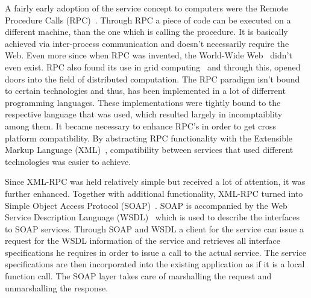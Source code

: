 A fairly early adoption of the service concept to computers were the Remote Procedure Calls (RPC)~\cite{Birrell:1984:IRP:2080.357392}.
Through RPC a piece of code can be executed on a different machine, than the one which is calling the procedure.
It is basically achieved via inter-process communication and doesn't necessarily require the Web.
Even more since when RPC was invented, the World-Wide Web~\cite{DBLP:journals/en/Berners-LeeCGP92} didn't even exist. 
RPC also found its use in grid computing~\cite{seymour2002overview} and through this, opened doors into the field of distributed computation.
The RPC paradigm isn't bound to certain technologies and thus, has been implemented in a lot of differrent programming languages.
These implementations were tightly bound to the respective language that was used, which resulted largely in incomptaiblity among them.
It became necessary to enhance RPC's in order to get cross platform compatibility.
By abstracting RPC functionality with the Extensible Markup Language (XML)~\cite{bray1998extensible}, compatibility between services that used different technologies was easier to achieve.

Since XML-RPC was held relatively simple but received a lot of attention, it was further enhanced.
Together with additional functionality, XML-RPC turned into Simple Object Access Protocol (SOAP)~\cite{box2000simple}.
SOAP is accompanied by the Web Service Description Language (WSDL)~\cite{christensen2001web} which is used to describe the interfaces to SOAP services.
Through SOAP and WSDL a client for the service can issue a request for the WSDL information of the service and retrieves all interface specifications he requires in order to issue a call to the actual service.
The service specifications are then incorporated into the existing application as if it is a local function call.
The SOAP layer takes care of marshalling the request and unmarshalling the response.

